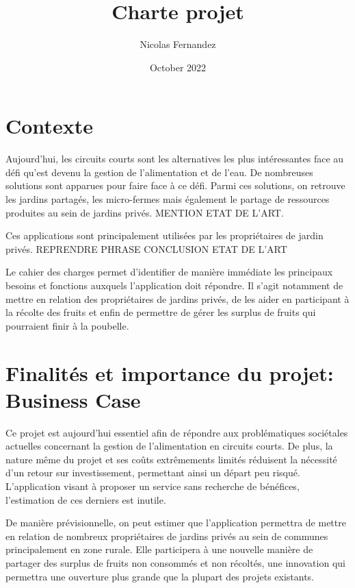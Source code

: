 \documentclass{article}
\title{Charte projet}
\author{Nicolas Fernandez}
\date{October 2022}
\begin{document}
\maketitle

\section{Contexte}

Aujourd'hui, les circuits courts sont les alternatives les plus intéressantes face au défi qu'est devenu la gestion de l'alimentation et de l'eau. De nombreuses solutions sont apparues pour faire face à ce défi. Parmi ces solutions, on retrouve les jardins partagés, les micro-fermes mais également le partage de ressources produites au sein de jardins privés. MENTION ETAT DE L'ART.

Ces applications sont principalement utilisées par les propriétaires de jardin privés. REPRENDRE PHRASE CONCLUSION ETAT DE L'ART

Le cahier des charges permet d'identifier de manière immédiate les principaux besoins et fonctions auxquels l'application doit répondre. Il s'agit notamment de mettre en relation des propriétaires de jardins privés, de les aider en participant à la récolte des fruits et enfin de permettre de gérer les surplus de fruits qui pourraient finir à la poubelle.

\maketitle

\section{Finalités et importance du projet: Business Case}

Ce projet est aujourd'hui essentiel afin de répondre aux problématiques sociétales actuelles concernant la gestion de l'alimentation en circuits courts. De plus, la nature même du projet et ses coûts extrêmements limités réduisent la nécessité d'un retour sur investissement, permettant ainsi un départ peu risqué. L'application visant à proposer un service sans recherche de bénéfices, l'estimation de ces derniers est inutile.

De manière prévisionnelle, on peut estimer que l'application permettra de mettre en relation de nombreux propriétaires de jardins privés au sein de communes principalement en zone rurale. Elle participera à une nouvelle manière de partager des surplus de fruits non consommés et non récoltés, une innovation qui permettra une ouverture plus grande que la plupart des projets existants.
\end{document}
